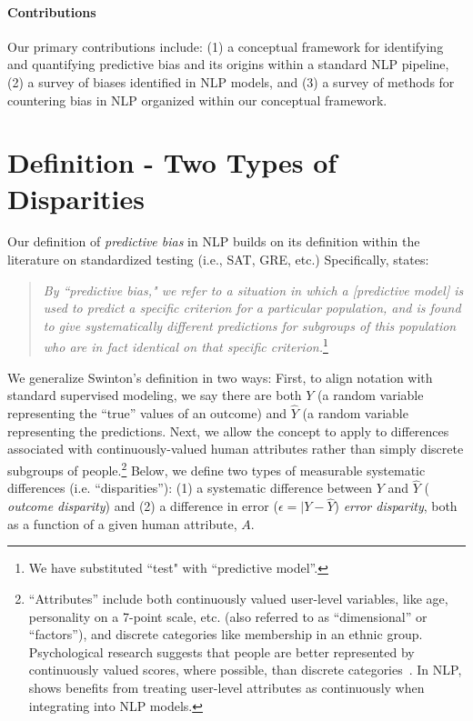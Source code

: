 \documentclass[11pt,a4paper]{article}
\begin{document}
\paragraph{Contributions}
Our primary contributions include: (1) a conceptual framework for identifying and quantifying predictive bias and its origins within a standard NLP pipeline,
(2) a survey of biases identified in NLP models,  and (3) a survey of methods for countering bias in NLP organized within our conceptual framework.


\section{Definition - Two Types of Disparities}
Our definition of \textit{predictive bias} in NLP builds on its definition within the literature on standardized testing (i.e., SAT, GRE, etc.) Specifically, 
 states: 
\begin{quote}
\begin{small}
\textit{By ``predictive bias," we refer to a situation in which a [predictive model] is used to predict a specific criterion for a particular population, and is found to give systematically different predictions for subgroups of this population who are in fact identical on that specific criterion.}\footnote{We have substituted ``test" with ``predictive model''.}
\end{small}
\end{quote}

We generalize Swinton's definition in two ways: 
First, to align notation with standard supervised modeling, we say there are both $Y$ (a random variable representing the ``true'' values of an outcome) and  $\hat{Y}$ (a random variable representing the predictions. 
Next, we allow the concept to apply to differences associated with continuously-valued human attributes rather than simply discrete subgroups of people.\footnote{``Attributes'' include both continuously valued user-level variables, like age, personality on a 7-point scale, etc. (also referred to as ``dimensional'' or ``factors''), and discrete categories like membership in an ethnic group. Psychological research suggests that people are better represented by continuously valued scores, where possible, than discrete categories~\cite{baumeister2007psychology,widiger2005diagnostic,mccrae1989reinterpreting}. In NLP,  shows benefits from treating user-level attributes as continuously when integrating into NLP models.}
Below, we define two types of measurable systematic differences (i.e. ``disparities''): (1) a systematic difference between $Y$ and $\hat{Y}$ ( \textit{outcome disparity}) and (2) a difference in error ($\epsilon = |Y - \hat{Y}$) \textit{error disparity}, both as a function of a given human attribute, $A$.
\end{document}
